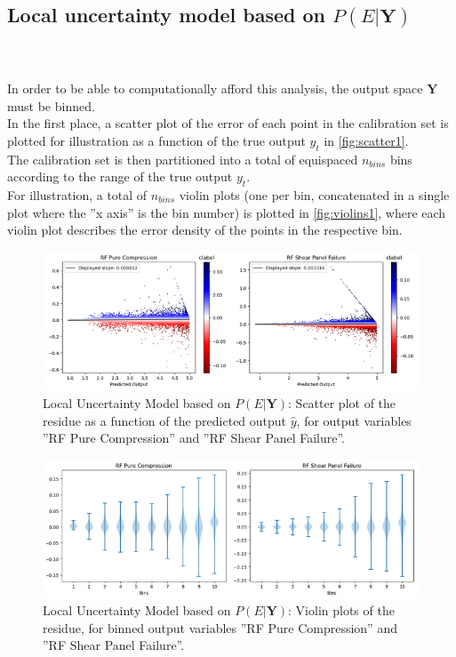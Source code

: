 \FloatBarrier
\subsection{Local uncertainty model based on $P(E|\mathbf{Y})$}
\paragraph{ \\}
In order to be able to computationally afford this analysis, the output space $\mathbf{Y}$ must be binned.\\
\indent In the first place, a scatter plot of the error of each point in the calibration set is plotted for illustration as a function of the true output $y_t$ in \autoref{fig:scatter1}.\\
\indent The calibration set is then partitioned into a total of equispaced $n_{bins}$ bins according to the range of the true output $y_t$.\\
\indent For illustration, a total of $n_{bins}$ violin plots (one per bin, concatenated in a single plot where the ''x axis'' is the bin number) is plotted in \autoref{fig:violins1}, where each violin plot describes the error density of the points in the respective bin.\\
%
\begin{figure}[!htb]
	\centering
	\includegraphics[width=\textwidth]{Figures/uncertainty/scatter1.png}
	\caption{Local Uncertainty Model based on $P(E|\mathbf{Y})$: Scatter plot of the residue as a function of the predicted output $\hat{y}$, for output variables ''RF Pure Compression'' and ''RF Shear Panel Failure''.}
	\label{fig:scatter1}
\end{figure}
\begin{figure}[!htb]
	\centering
	\includegraphics[width=\textwidth]{Figures/uncertainty/violines1.png}
	\caption{Local Uncertainty Model based on $P(E|\mathbf{Y})$: Violin plots of the residue, for binned output variables ''RF Pure Compression'' and ''RF Shear Panel Failure''.}
	\label{fig:violins1}
\end{figure}

